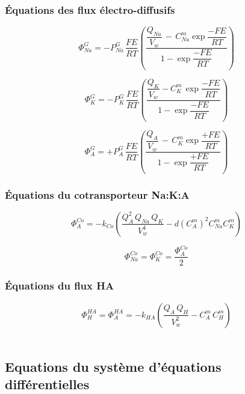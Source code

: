 \documentclass[a4paper,fleqn]{article}
\begin{document}
\subsubsection*{Équations des flux électro-diffusifs}

\begin{equation}
\Phi_{Na}^{G}=-P_{Na}^{G}\,\frac{FE}{RT}\left(\frac{\dfrac{Q_{Na}}{V_w}\,-\,{C_{Na}^{m}\exp{\dfrac{-FE}{RT}}}}{1 - \exp{\dfrac{-FE}{RT}}}\right)
\end{equation}

\begin{equation}
\Phi_{K}^{G}=-P_{K}^{G}\,\frac{FE}{RT}\left(\dfrac{\dfrac{Q_{K}}{V_w}-{C_{K}^{m}\,\exp{\dfrac{-FE}{RT}}}}{1 - \exp{\dfrac{-FE}{RT}}}\right)
\end{equation}

\begin{equation}
\Phi_{A}^{G}=+P_{A}^{G}\,\frac{FE}{RT}\left(\dfrac{\dfrac{Q_{A}}{V_w}\,-\,{C_{K}^{m}\exp{\dfrac{+FE}{RT}}}}{1 - \exp{\dfrac{+FE}{RT}}}\right)
\end{equation}

\subsubsection*{Équations du cotransporteur Na:K:A}

\begin{equation}
\Phi_{A}^{Co}=-k_{Co}\left(\frac{Q_{A}^2\,Q_{Na}\,Q_{K}}{V_w^4}-d\left(C_{A}^{m}\right)^2C_{Na}^{m}C_{K}^{m}\right)
\end{equation}

\begin{equation}
\Phi_{Na}^{Co}=\Phi_{K}^{Co}=\frac{\Phi_{A}^{Co}}{2}
\end{equation}

\subsubsection*{Équations du flux HA}

\begin{equation}
\Phi_{H}^{HA}=\Phi_{A}^{HA}=-k_{HA}( \frac{Q_A\,Q_H}{V_w^2} - C_{A}^{m}\,C_{H}^{m})
\end{equation}\\

\subsection{Equations du système d'équations différentielles}
\end{document}
